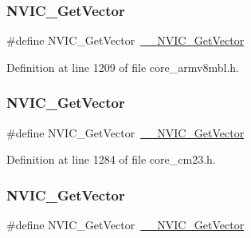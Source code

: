 \subsubsection{\texorpdfstring{N\+V\+I\+C\+\_\+\+Get\+Vector}{NVIC\_GetVector}\hspace{0.1cm}{\footnotesize\ttfamily [5/13]}}
{\footnotesize\ttfamily \#define N\+V\+I\+C\+\_\+\+Get\+Vector~\hyperlink{group___c_m_s_i_s___core___n_v_i_c_functions_ga44b665d2afb708121d9b10c76ff00ee5}{\+\_\+\+\_\+\+N\+V\+I\+C\+\_\+\+Get\+Vector}}



Definition at line 1209 of file core\+\_\+armv8mbl.\+h.

\mbox{\label{group___c_m_s_i_s___core___n_v_i_c_functions_ga955eb1c33a3dcc62af11a8385e8c0fc8}} 
\subsubsection{\texorpdfstring{N\+V\+I\+C\+\_\+\+Get\+Vector}{NVIC\_GetVector}\hspace{0.1cm}{\footnotesize\ttfamily [6/13]}}
{\footnotesize\ttfamily \#define N\+V\+I\+C\+\_\+\+Get\+Vector~\hyperlink{group___c_m_s_i_s___core___n_v_i_c_functions_ga44b665d2afb708121d9b10c76ff00ee5}{\+\_\+\+\_\+\+N\+V\+I\+C\+\_\+\+Get\+Vector}}



Definition at line 1284 of file core\+\_\+cm23.\+h.

\mbox{\label{group___c_m_s_i_s___core___n_v_i_c_functions_ga955eb1c33a3dcc62af11a8385e8c0fc8}} 
\subsubsection{\texorpdfstring{N\+V\+I\+C\+\_\+\+Get\+Vector}{NVIC\_GetVector}\hspace{0.1cm}{\footnotesize\ttfamily [7/13]}}
{\footnotesize\ttfamily \#define N\+V\+I\+C\+\_\+\+Get\+Vector~\hyperlink{group___c_m_s_i_s___core___n_v_i_c_functions_ga44b665d2afb708121d9b10c76ff00ee5}{\+\_\+\+\_\+\+N\+V\+I\+C\+\_\+\+Get\+Vector}}



